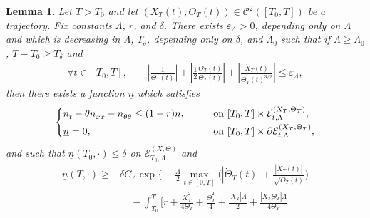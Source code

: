 \documentclass[11pt]{article}    %
\newtheorem{lemma}[theorem]{Lemma}
\renewcommand{\epsilon}{\varepsilon}
\begin{document}
\begin{lemma}\label{lem:movement}
Let $T > T_0$ and let $(X_T(t), \Theta_T(t)) \in \mathcal{C}^2([T_0,T])$ be a trajectory.  Fix constants $\Lambda$, $r$, and $\delta$. There exists $\epsilon_\Lambda > 0$, depending only on $\Lambda$ and which is decreasing in $\Lambda$, $T_\delta$, depending only on $\delta$, and $\Lambda_0$ such that if $\Lambda \geq \Lambda_0$, $T - T_0 \geq T_\delta$ and
\begin{equation}\label{eq:lemma_condition}
\begin{split}
\forall t\in [T_0,T], \qquad	\left|\frac{1}{\Theta_{T}(t)}\right|  +  \left|\frac{1}{2} \frac{\dot\Theta_{T}(t)}{\Theta_{T}(t)}\right| + \left|\frac{\dot X_{T}(t)}{\Theta_{T}(t)^{3/2}}\right| \leq \epsilon_\Lambda,
\end{split}
\end{equation}
then there exists a function $\underline n$ which satisfies
\begin{equation}\label{eq:subsolE}
\begin{cases}
\underline n_t - \theta \underline n_{xx} - \underline n_{\theta\theta} \leq  (1 - r)\underline n, & \qquad \text{on } [T_0,T] \times \mathcal{E}_{t,\Lambda}^{\left( X_T , \Theta_T \right)}, \smallskip\\
\underline n = 0,  &\qquad \text{on } [T_0,T] \times \partial\mathcal{E}_{t,\Lambda}^{\left( X_T , \Theta_T \right)}, 
\end{cases}
\end{equation}
and such that $\underline n(T_0,\cdot) \leq \delta$ on  $\mathcal{E}_{T_0,\Lambda}^{\left( X , \Theta \right)}$ and
\begin{equation}\label{eq:constantsliding}
\begin{split}
	\underline n(T,\cdot) \geq &\delta C_\Lambda \exp\Big\{ - \frac{\Lambda}{2} \max_{t\in[0,T]} \Big( |\dot\Theta_{T}(t)| + \frac{|\dot X_{T}(t)|}{\sqrt{\Theta_{T}(t)}} \Big)\\
	&~~~~~ - \int_{T_0}^{T} \Big[ r + \frac{\dot{X}_{T}^2}{4\Theta_{T}} + \frac{\dot{\Theta}_{T}^2}{4} + 
			\frac{|\ddot{X}_{T}|\Lambda}{2} + \frac{|\dot{X}_{T}\dot{\Theta}_{T}|\Lambda}{4\Theta_{T}}  

\end{split}
\end{equation}
\end{lemma}
\end{document}
